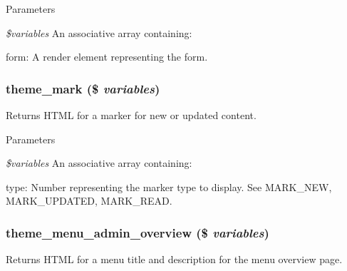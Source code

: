 \begin{DoxyParams}{Parameters}
\item[{\em \$variables}]An associative array containing:
\begin{DoxyItemize}
\item form: A render element representing the form. 
\end{DoxyItemize}\end{DoxyParams}
\hypertarget{group__themeable_ga10b9e641d13efcf0ed3e55fd03bc4f54}{
\subsubsection[{theme\_\-mark}]{\setlength{\rightskip}{0pt plus 5cm}theme\_\-mark (\$ {\em variables})}}
\label{group__themeable_ga10b9e641d13efcf0ed3e55fd03bc4f54}
Returns HTML for a marker for new or updated content.


\begin{DoxyParams}{Parameters}
\item[{\em \$variables}]An associative array containing:
\begin{DoxyItemize}
\item type: Number representing the marker type to display. See MARK\_\-NEW, MARK\_\-UPDATED, MARK\_\-READ. 
\end{DoxyItemize}\end{DoxyParams}
\hypertarget{group__themeable_gaa3f678d076d7ee037013c813d826240c}{
\subsubsection[{theme\_\-menu\_\-admin\_\-overview}]{\setlength{\rightskip}{0pt plus 5cm}theme\_\-menu\_\-admin\_\-overview (\$ {\em variables})}}
\label{group__themeable_gaa3f678d076d7ee037013c813d826240c}
Returns HTML for a menu title and description for the menu overview page.


